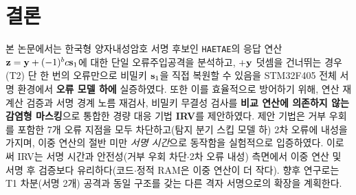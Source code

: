 \section{결론}
\label{sec:concl}

본 논문에서는 한국형 양자내성암호 서명 후보인 \texttt{HAETAE}의 응답 연산
$\mathbf{z}=\mathbf{y}+(-1)^b c\mathbf{s}_1$에 대한 단일 오류주입공격을 분석하고, $+\mathbf{y}$ 덧셈을 건너뛰는
경우(T2) 단 한 번의 오류만으로 비밀키 $\mathbf{s}_1$을 직접 복원할 수 있음을 STM32F405 전체 서명
환경에서 \textbf{오류 모델 하에} 실증하였다. 또한 이를
효율적으로 방어하기 위해, 연산 재계산 검증과 서명 경계 노름
재검사, 비밀키 무결성 검사를 \textbf{비교 연산에 의존하지 않는 감염형 마스킹}으로 통합한 경량 대응
기법 \textbf{IRV}를 제안하였다. 제안 기법은 거부 우회를 포함한 7개 오류 지점을 모두
차단하고(탐지 분기 스킵 모델 하) 2차 오류에 내성을 가지며, 이중 연산의 절반 미만 \emph{서명 시간}으로
동작함을 실험적으로 입증하였다. 이로써 IRV는 서명 시간과 안전성(거부 우회 차단$\cdot$2차 오류 내성)
측면에서 이중 연산 및 서명 후 검증보다 유리하다(코드$\cdot$정적 RAM은 이중 연산이 더 작다). 향후
연구로는 T1 차분(서명 2개) 공격과 동일 구조를 갖는 다른 격자 서명으로의 확장을 계획한다.
